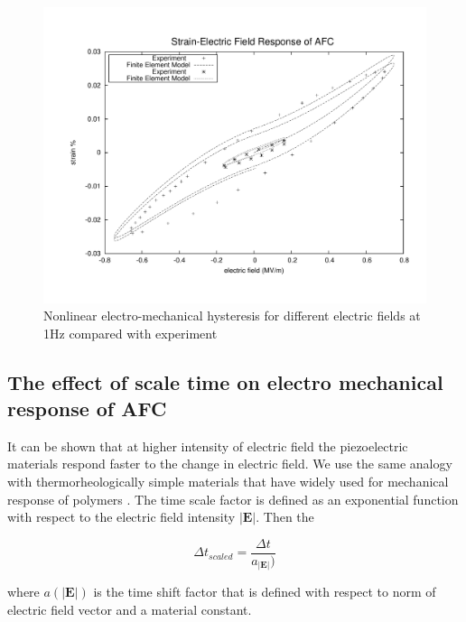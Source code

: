 \begin{figure} 
\centering
\includegraphics[trim = 0mm 0mm 0mm 0mm,width=5.0in]
{./chap_4_structural_analyses/afc_unit_cell/non_linear_hysteris_afc/non_linear_electric_field_vs_polarization.pdf}
\caption{Nonlinear electro-mechanical hysteresis for different electric fields at 1Hz compared with experiment}
\label{fig:non_linear_electric_field_vs_polarization}
\end{figure}

\subsection{The effect of scale time on electro mechanical response of AFC}
It can be shown that at higher intensity of electric field the piezoelectric materials respond faster to the change in electric field.
We use the same analogy with thermorheologically simple materials that have widely used for mechanical response of polymers \cite{haj2004numerical, tscharnuter2012nonlinear}.
The time scale factor is defined as an exponential function with respect to the electric field intensity $|\textbf {E}|$.
Then the 



\begin{equation}
	\Delta t _{scaled} = \frac{ \Delta t } { a_{ |\textbf {E}| } ) }
\label{equation:time_scaling}	
\end{equation}

where ${a(|\textbf {E}|)}$ is the time shift factor that is defined with respect to norm of electric field vector and a material constant.

